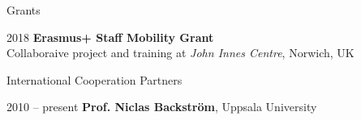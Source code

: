 \documentclass[10pt]{article}
\begin{document}
\begin{cv}
\begin{cvlist}{Grants}
 \item[2018] \textbf{Erasmus+ Staff Mobility Grant}\\
 Collaboraive project and training at \textit{John Innes Centre}, Norwich, UK 
\end{cvlist}

\begin{cvlist}{International Cooperation Partners}
\item[2010 -- present] \textbf{Prof. Niclas Backstr\"om}, Uppsala University
\end{cvlist}


\end{cv}
\end{document}
